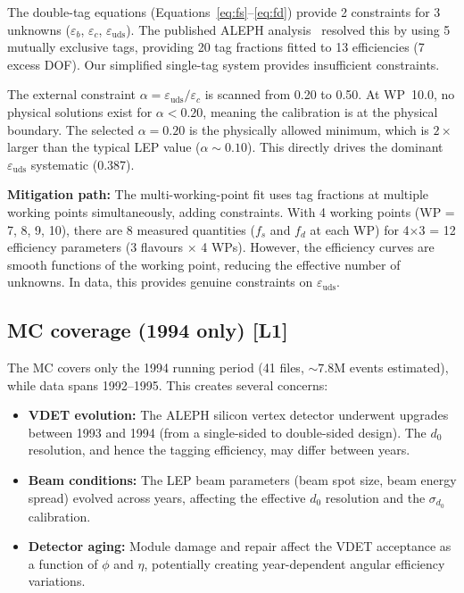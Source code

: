 \documentclass[11pt,a4paper]{article}
\begin{document}
The double-tag equations (Equations~\ref{eq:fs}--\ref{eq:fd}) provide 2 constraints
for 3 unknowns ($\varepsilon_b$, $\varepsilon_c$, $\varepsilon_\mathrm{uds}$). The
published ALEPH analysis~\cite{ALEPH:Rb:1996} resolved this by using 5 mutually
exclusive tags, providing 20 tag fractions fitted to 13 efficiencies (7 excess DOF).
Our simplified single-tag system provides insufficient constraints.

The external constraint $\alpha = \varepsilon_\mathrm{uds} / \varepsilon_c$ is scanned
from 0.20 to 0.50. At WP~10.0, no physical solutions exist for $\alpha < 0.20$,
meaning the calibration is at the physical boundary. The selected $\alpha = 0.20$ is
the physically allowed minimum, which is $2\times$ larger than the typical LEP value
($\alpha \sim 0.10$). This directly drives the dominant $\varepsilon_\mathrm{uds}$
systematic (0.387).

\textbf{Mitigation path:} The multi-working-point fit uses tag fractions at multiple
working points simultaneously, adding constraints. With 4 working points (WP = 7, 8, 9, 10),
there are 8 measured quantities ($f_s$ and $f_d$ at each WP) for 4$\times$3 = 12
efficiency parameters (3 flavours $\times$ 4 WPs). However, the efficiency curves
are smooth functions of the working point, reducing the effective number of unknowns.
In data, this provides genuine constraints on $\varepsilon_\mathrm{uds}$.

\subsection{MC coverage (1994 only) [L1]}

The MC covers only the 1994 running period (41 files, $\sim 7.8$M events estimated),
while data spans 1992--1995. This creates several concerns:

\begin{itemize}
\item \textbf{VDET evolution:} The ALEPH silicon vertex detector underwent upgrades
between 1993 and 1994 (from a single-sided to double-sided design). The $d_0$
resolution, and hence the tagging efficiency, may differ between years.

\item \textbf{Beam conditions:} The LEP beam parameters (beam spot size, beam energy
spread) evolved across years, affecting the effective $d_0$ resolution and the
$\sigma_{d_0}$ calibration.

\item \textbf{Detector aging:} Module damage and repair affect the VDET acceptance
as a function of $\phi$ and $\eta$, potentially creating year-dependent angular
efficiency variations.
\end{itemize}
\end{document}
